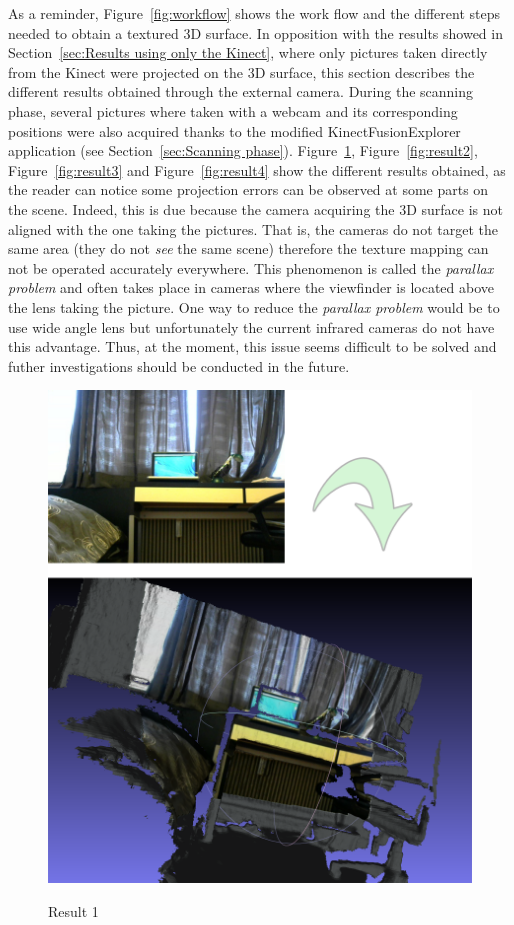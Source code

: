 As a reminder, Figure~\ref{fig:workflow} shows the work flow and the different steps needed to obtain a textured 3D surface. In opposition with the results showed in Section~\ref{sec:Results using only the Kinect}, where only pictures taken directly from the Kinect were projected on the 3D surface, this section describes the different results obtained through the external camera. During the scanning phase, several pictures where taken with a webcam and its corresponding positions were also acquired thanks to the modified KinectFusionExplorer application (see Section~\ref{sec:Scanning phase}). Figure~\ref{fig:result1}, Figure~\ref{fig:result2}, Figure~\ref{fig:result3} and Figure~\ref{fig:result4} show the different results obtained, as the reader can notice some projection errors can be observed at some parts on the scene. Indeed, this is due because the camera acquiring the 3D surface is not aligned with the one taking the pictures. That is, the cameras do not target the same area (they do not \textit{see} the same scene) therefore the texture mapping can not be operated accurately everywhere. This phenomenon is called the \textit{parallax problem} and often takes place in cameras where the viewfinder is located above the lens taking the picture. One way to reduce the \textit{parallax problem} would be to use wide angle lens but unfortunately the current infrared cameras do not have this advantage. Thus, at the moment, this issue seems difficult to be solved and futher investigations should be conducted in the future.

\begin{figure}
\caption{Result 1}
\centering
    \includegraphics[width=1.0\textwidth]{images/result1.png}
\label{fig:result1}
\end{figure}

